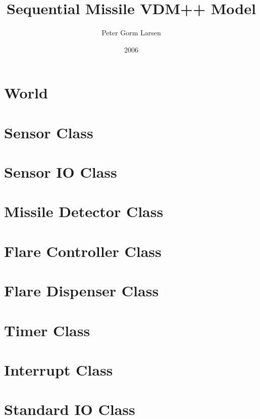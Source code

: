 \documentclass[\pformat,12pt]{article}
\title{Sequential Missile VDM++ Model}
\author{Peter Gorm Larsen}
\date{2006}
\begin{document}
\maketitle


\section{World}


\section{Sensor Class}



\section{Sensor IO Class}



\section{Missile Detector Class}



\section{Flare Controller Class}



\section{Flare Dispenser Class}



\section{Timer Class}



\section{Interrupt Class}



\section{Standard IO Class}


\end{document}
